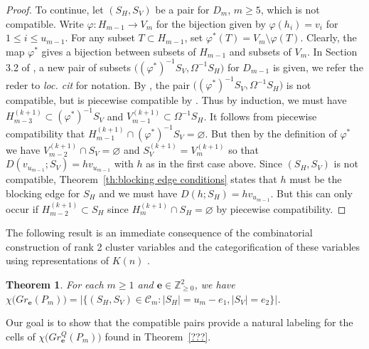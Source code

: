 \documentclass{amsart}
\newtheorem{theorem}{Theorem}[section]
\newcommand{\bfe}{\mathbf{e}}
\newcommand{\cC}{\mathcal{C}}
\newcommand{\ZZ}{\mathbb{Z}}
\begin{document}
\begin{proof}
  To continue, let $(S_H,S_V)$ be a pair for $D_m$, $m\ge5$, which is not compatible.
  Write $\varphi:H_{m-1}\to V_m$ for the bijection given by $\varphi(h_i)=v_i$ for $1\le i\le u_{m-1}$.
  For any subset $T\subset H_{m-1}$, set $\varphi^*(T)=V_m\setminus\varphi(T)$.
  Clearly, the map $\varphi^*$ gives a bijection between subsets of $H_{m-1}$ and subsets of $V_m$.
  In Section 3.2 of \cite{rupel}, a new pair of subsets $\big((\varphi^*)^{-1}S_V,\Omega^{-1}S_H\big)$ for $D_{m-1}$ is given, we refer the reder to \emph{loc. cit} for notation.
  By \cite[Proposition 3.10]{rupel}, the pair $\big((\varphi^*)^{-1}S_V,\Omega^{-1}S_H\big)$ is not compatible, but is piecewise compatible by \cite[proposition 3.16]{rupel}.
  Thus by induction, we must have $H_{m-3}^{(k+1)}\subset(\varphi^*)^{-1}S_V$ and $V_{m-1}^{(k+1)}\subset\Omega^{-1}S_H$.
  It follows from piecewise compatibility that $H_{m-1}^{(k+1)}\cap(\varphi^*)^{-1}S_V=\varnothing$.
  But then by the definition of $\varphi^*$ we have $V_{m-2}^{(k+1)}\cap S_V=\varnothing$ and $S_V^{(k+1)}=V_m^{(k+1)}$ so that $D(v_{u_{m-1}};S_V)=hv_{u_{m-1}}$ with $h$ as in the first case above.
  Since $(S_H,S_V)$ is not compatible, Theorem~\ref{th:blocking edge conditions} states that $h$ must be the blocking edge for $S_H$ and we must have $D(h;S_H)=hv_{u_{m-1}}$.
  But this can only occur if $H_{m-2}^{(k+1)}\subset S_H$ since $H_m^{(k+1)}\cap S_H=\varnothing$ by piecewise compatibility.
\end{proof}


The following result is an immediate consequence of the combinatorial construction of rank 2 cluster variables \cite{lee-li-zelevinsky} and the categorification of these variables using representations of $K(n)$ \cite{cc,caldero-keller}.
\begin{theorem}\cite{lee-li-zelevinsky}
  For each $m\ge1$ and $\bfe\in\ZZ_{\ge0}^2$, we have $\chi\big(Gr_\bfe(P_m)\big)=\big|\{(S_H,S_V)\in\cC_m:|S_H|=u_m-e_1,|S_V|=e_2\}\big|$.
\end{theorem}

Our goal is to show that the compatible pairs provide a natural labeling for the cells of $\chi\big(Gr^Q_\bfe(P_m)\big)$ found in Theorem~\ref{???}.
\end{document}
